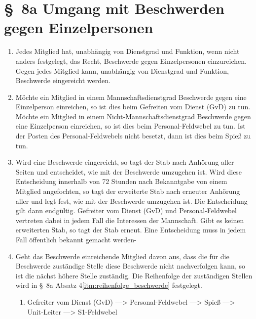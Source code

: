 \section*{\S~8a Umgang mit Beschwerden gegen Einzelpersonen}
\label{sec:umgang_mit_beschwerden_gegen_einzelpersonen}

\begin{enumerate}[label=(\arabic*)]
    \item Jedes Mitglied hat, unabhängig von Dienstgrad und Funktion, wenn nicht anders festgelegt, das Recht, Beschwerde gegen Einzelpersonen einzureichen. Gegen jedes Mitglied kann, unabhängig von Dienstgrad und Funktion, Beschwerde eingereicht werden.    
    \item Möchte ein Mitglied in einem Mannschaftsdienstgrad Beschwerde gegen eine Einzelperson einreichen, so ist dies beim Gefreiten vom Dienst (GvD) zu tun. Möchte ein Mitglied in einem Nicht-Mannschaftsdienstgrad Beschwerde gegen eine Einzelperson einreichen, so ist dies beim Personal-Feldwebel zu tun. Ist der Posten des Personal-Feldwebels nicht besetzt, dann ist dies beim Spieß zu tun.    
    \item Wird eine Beschwerde eingereicht, so tagt der Stab nach Anhörung aller Seiten und entscheidet, wie mit der Beschwerde umzugehen ist. Wird diese Entscheidung innerhalb von 72 Stunden nach Bekanntgabe von einem Mitglied angefochten, so tagt der erweiterte Stab nach erneuter Anhörung aller und legt fest, wie mit der Beschwerde umzugehen ist. Die Entscheidung gilt dann endgültig. Gefreiter vom Dienst (GvD) und Personal-Feldwebel vertreten dabei in jedem Fall die Interessen der Mannschaft. Gibt es keinen erweiterten Stab, so tagt der Stab erneut. Eine Entscheidung muss in jedem Fall öffentlich bekannt gemacht werden-    
    \item Geht das Beschwerde einreichende Mitglied davon aus, dass die für die Beschwerde zuständige Stelle diese Beschwerde nicht nachverfolgen kann, so ist die nächst höhere Stelle zuständig. Die Reihenfolge der zuständigen Stellen wird in \S~8a Absatz 4\ref{itm:reihenfolge_beschwerde} festgelegt.
    \begin{enumerate}[label=(\Alph*)]
        \item\label{itm:reihenfolge_beschwerde} Gefreiter vom Dienst (GvD) —> Personal-Feldwebel —> Spieß —> Unit-Leiter —> S1-Feldwebel

\end{enumerate}
\end{enumerate}
